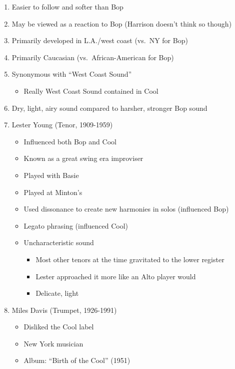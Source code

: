 \documentclass[]{article}
\providecommand{\tightlist}{%
  \setlength{\itemsep}{0pt}\setlength{\parskip}{0pt}}
\begin{document}
\begin{enumerate}
\def\labelenumi{\arabic{enumi}.}
\tightlist
\item
  Easier to follow and softer than Bop
\item
  May be viewed as a reaction to Bop (Harrison doesn't think so though)
\item
  Primarily developed in L.A./west coast (vs.~NY for Bop)
\item
  Primarily Caucasian (vs.~African-American for Bop)
\item
  Synonymous with ``West Coast Sound''

  \begin{itemize}
  \tightlist
  \item
    Really West Coast Sound contained in Cool
  \end{itemize}
\item
  Dry, light, airy sound compared to harsher, stronger Bop sound
\item
  Lester Young (Tenor, 1909-1959)

  \begin{itemize}
  \tightlist
  \item
    Influenced both Bop and Cool
  \item
    Known as a great swing era improviser
  \item
    Played with Basie
  \item
    Played at Minton's
  \item
    Used dissonance to create new harmonies in solos (influenced Bop)
  \item
    Legato phrasing (influenced Cool)
  \item
    Uncharacteristic sound

    \begin{itemize}
    \tightlist
    \item
      Most other tenors at the time gravitated to the lower register
    \item
      Lester approached it more like an Alto player would
    \item
      Delicate, light
    \end{itemize}
  \end{itemize}
\item
  Miles Davis (Trumpet, 1926-1991)

  \begin{itemize}
  \tightlist
  \item
    Disliked the Cool label
  \item
    New York musician
  \item
    Album: ``Birth of the Cool'' (1951)


\end{itemize}
\end{enumerate}
\end{document}
